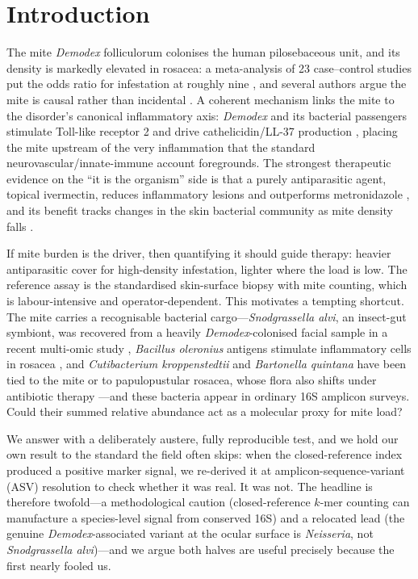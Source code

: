 \documentclass[11pt]{article}
\newcommand{\salvi}{\textit{Snodgrassella alvi}}
\newcommand{\demodex}{\textit{Demodex}}
\begin{document}
\section{Introduction}

The mite \demodex{} folliculorum colonises the human pilosebaceous unit, and its
density is markedly elevated in rosacea: a meta-analysis of 23 case--control
studies put the odds ratio for infestation at roughly nine
\citep{chang2017}, and several authors argue the mite is causal rather than
incidental \citep{forton2020}. A coherent mechanism links the mite to the
disorder's canonical inflammatory axis: \demodex{} and its bacterial passengers
stimulate Toll-like receptor 2 and drive cathelicidin/LL-37 production
\citep{yamasaki2007}, placing the mite upstream of the very inflammation that
the standard neurovascular/innate-immune account foregrounds. The strongest
therapeutic evidence on the ``it is the organism'' side is that a purely
antiparasitic agent, topical ivermectin, reduces inflammatory lesions and
outperforms metronidazole \citep{steingold2014,taieb2015}, and its benefit
tracks changes in the skin bacterial community as mite density falls
\citep{nakatsuji2025}.

If mite burden is the driver, then quantifying it should guide therapy: heavier
antiparasitic cover for high-density infestation, lighter where the load is low.
The reference assay is the standardised skin-surface biopsy with mite counting,
which is labour-intensive and operator-dependent. This motivates a tempting
shortcut. The mite carries a recognisable bacterial cargo---\salvi{}, an
insect-gut symbiont, was recovered from a heavily \demodex-colonised facial
sample in a recent multi-omic study \citep{olah2025}, \textit{Bacillus
oleronius} antigens stimulate inflammatory cells in rosacea \citep{lacey2007},
and \textit{Cutibacterium kroppenstedtii} and \textit{Bartonella quintana} have
been tied to the mite or to papulopustular rosacea, whose flora also shifts under
antibiotic therapy \citep{murillo2014,rainer2020,woo2020}---and these bacteria
appear in ordinary
16S amplicon surveys. Could their summed relative abundance act as a molecular
proxy for mite load?

We answer with a deliberately austere, fully reproducible test, and we hold our
own result to the standard the field often skips: when the closed-reference index
produced a positive marker signal, we re-derived it at amplicon-sequence-variant
(ASV) resolution to check whether it was real. It was not. The headline is
therefore twofold---a methodological caution (closed-reference $k$-mer counting
can manufacture a species-level signal from conserved 16S) and a relocated lead
(the genuine \demodex-associated variant at the ocular surface is
\textit{Neisseria}, not \salvi{})---and we argue both halves are useful precisely
because the first nearly fooled us.
\end{document}
